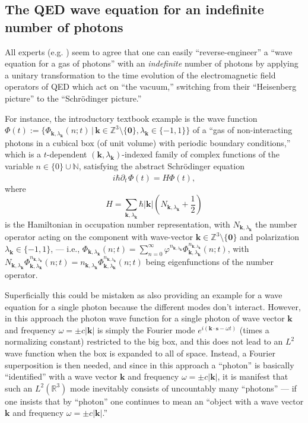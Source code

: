 \documentclass[12pt]{article}
\theoremstyle{definition}
\newcommand{\vect}[1] {\boldsymbol{{ #1}} }
\newcommand{\kV}{{\vect{k}}}		%
\newcommand{\sV}{{\vect{s}}}            %
\numberwithin{equation}{section}
\newcommand{\beq}{\begin{equation}}
\newcommand{\eeq}{\end{equation}}
\newcommand{\Nset}{{\mathbb N}}
\newcommand{\Rset}{{\mathbb R}}
\newcommand{\Zset}{{\mathbb Z}}
\newcommand{\pdt}{{\partial_t^{\phantom{0}}}}
\begin{document}
\subsection{The QED wave equation for an indefinite number of photons}

 All experts (e.g. \cite{OppiPHOTON,LandauLifshitzBOOKrelQM,WeinbergBOOKqft,IBBphotonREV,IBBZBBphotonREV, ScullyBOOK, Cohen-Tannoudji})
seem to agree that one can easily ``reverse-engineer'' a ``wave equation for a gas of photons''
with an \emph{indefinite} number of photons by applying a unitary transformation to the time evolution of the 
electromagnetic field operators of QED which act on ``the vacuum,'' switching from their ``Heisenberg picture'' 
to the ``Schr\"odinger picture.'' 

 For instance, the introductory textbook example is the wave function 
$\Phi(t) :=\{\Phi_{\kV,\lambda_\kV}(n;t)\,|\, \kV\in \Zset^3\!\setminus\!\{\boldsymbol{0}\},\lambda_\kV\in\{-1,1\}\}$ of  a 
``gas of non-interacting photons in a cubical box (of unit volume) with periodic boundary conditions,'' 
which is a $t$-dependent $(\kV,\lambda_\kV)$-indexed family of complex functions of the variable $n\in\{0\}\cup\Nset$,
satisfying the abstract Schr\"odinger equation
\beq \label{photonWEQUforINDEFINITELYmanyPHOTONS}
i\hbar \pdt \Phi(t) = H \Phi(t),
\eeq
where 
\beq \label{HforINDEFINITELYmanyPHOTONS}
H  = \sum_{\kV,\lambda_\kV} \hbar |\kV| ( N_{\kV,\lambda_\kV} + \textstyle\frac12) 
\eeq
is the Hamiltonian in occupation number representation, with $N_{\kV,\lambda_\kV}$ the number operator acting on
the component with wave-vector 
$\kV\in \Zset^3\!\setminus\!\{\boldsymbol{0}\}$ and polarization $\lambda_\kV\in\{-1,1\}$, 
--- i.e.,  
$\Phi_{\kV,\lambda_\kV}(n;t) =\sum_{n=0}^\infty \varphi^{n_{\kV,\lambda_\kV}}\Phi_{{\kV,\lambda_\kV}}^{n_{\kV,\lambda_\kV}}(n;t)$,
with $N_{\kV,\lambda_\kV}\Phi_{\kV,\lambda_\kV}^{n_{\kV,\lambda_\kV}}(n;t) = 
n_{\kV,\lambda_\kV}\Phi_{\kV,\lambda_\kV}^{n_{\kV,\lambda_\kV}}(n;t)$ being eigenfunctions of the number operator.

 Superficially this could be mistaken as also providing an example for a wave equation for a single photon because the different
modes don't interact. 
 However, in this approach the photon wave function for a single photon of wave vector $\kV$ and frequency $\omega = \pm c|\kV|$ is
simply the Fourier mode $e^{i(\kV\cdot\sV - \omega t)}$ (times a normalizing constant) restricted to the big box, and this
does not lead to an $L^2$ wave function when the box is expanded to  all of space. 
 Instead, a Fourier superposition is then needed, and since in this approach a ``photon'' is basically ``identified'' with a
wave vector $\kV$ and frequency $\omega = \pm c|\kV|$, it is manifest that such an $L^2(\Rset^3)$ mode inevitably consists of 
uncountably many ``photons'' --- if one insists that by ``photon'' one continues to mean an ``object with a 
wave vector $\kV$ and frequency $\omega = \pm c|\kV|$.''
\end{document}
